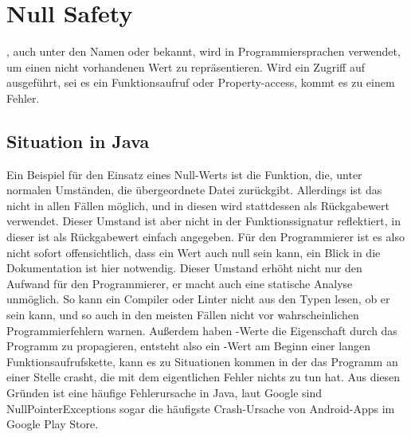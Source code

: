 
\section{Null Safety}\label{sec:null-safety}

\renewcommand{\kapitelautor}{Autor: Marvin Kurka}

, auch unter den Namen  oder  bekannt, wird in Programmiersprachen
verwendet, um einen nicht vorhandenen Wert zu repräsentieren.
Wird ein Zugriff auf  ausgeführt, sei es ein Funktionsaufruf oder Property-access, kommt es zu
einem Fehler.

\subsection{Situation in Java}
Ein Beispiel für den Einsatz eines Null-Werts ist die  Funktion, die, unter normalen
Umständen, die übergeordnete Datei zurückgibt.
Allerdings ist das nicht in allen Fällen möglich, und in diesen wird  stattdessen als Rückgabewert
verwendet.\cite{jdocFile}
Dieser Umstand ist aber nicht in der Funktionssignatur reflektiert, in dieser ist als Rückgabewert einfach
 angegeben.
Für den Programmierer ist es also nicht sofort offensichtlich, dass ein Wert auch null sein kann, ein Blick in die
Dokumentation ist hier notwendig.
Dieser Umstand erhöht nicht nur den Aufwand für den Programmierer, er macht auch eine statische Analyse unmöglich.
So kann ein Compiler oder Linter nicht aus den Typen lesen, ob er  sein kann, und so auch in den
meisten Fällen nicht vor wahrscheinlichen Programmierfehlern warnen.
Außerdem haben -Werte die Eigenschaft durch das Programm zu propagieren, entsteht also ein
-Wert am Beginn einer langen Funktionsaufrufskette, kann es zu Situationen kommen in der das Programm
an einer Stelle crasht, die mit dem eigentlichen Fehler nichts zu tun hat.
Aus diesen Gründen ist  eine häufige Fehlerursache in Java, laut Google sind
NullPointerExceptions sogar die häufigste Crash-Ursache von Android-Apps im Google Play Store.\cite{androidDevNPE}

